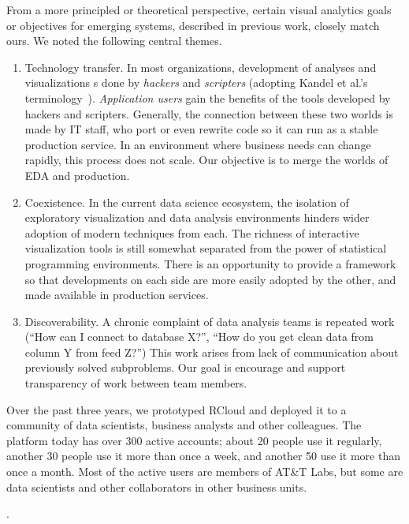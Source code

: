 From a more principled or theoretical perspective, certain visual analytics
goals or objectives for emerging systems, described in previous work,
closely match ours. We noted the following central themes.

\begin{enumerate}

\item Technology transfer.
In most organizations, development of analyses and visualizations 
s done by \emph{hackers} and \emph{scripters} (adopting Kandel et al.'s
terminology~\cite{Kandel:2012:EDA}). \emph{Application users} 
gain the benefits of the tools developed by hackers and scripters.
Generally, the connection between these two worlds is made by IT staff,
who port or even rewrite code so it can run as a stable production service.
In an environment where business needs can change rapidly, this
process does not scale. Our objective is to merge the worlds
of EDA and production.

\item Coexistence. In the current data science ecosystem, the
isolation of exploratory visualization and data analysis
environments hinders wider adoption of modern techniques from each.
The richness of interactive visualization tools is still somewhat
separated from the power of statistical programming environments.
There is an opportunity to provide a framework so that developments
on each side are more easily adopted by the other, and made available
in production services.

\item Discoverability. A chronic complaint of data analysis teams is
repeated work (``How can I connect to database X?'', ``How do you get
clean data from column Y from feed Z?'') This work arises from lack of
communication about previously solved subproblems. Our goal is encourage
and support transparency of work between team members.

\end{enumerate}

Over the past three years, we prototyped RCloud and deployed it to
a community of data scientists, business analysts and other colleagues.  The
platform today has over 300 active accounts; about 20 people use it regularly,
another 30 people use it more than once a week, and another 50 use it more than
once a month.  Most of the
active users are members of AT\&T Labs, but some are data scientists and other
collaborators in other business units.

.

